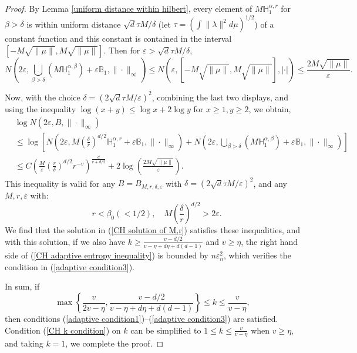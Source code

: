 \documentclass[ejs,noshowframe]{imsart}
\theoremstyle{plain}
\theoremstyle{definition}
\theoremstyle{remark}
\begin{document}
\begin{appendix}
\begin{proof}
By Lemma \ref{uniform distance within hilbert}, every element of $M \mathbb{H}_1^{\alpha,r}$ for $\beta>\delta$ is within uniform distance $ \sqrt{d} \tau M/\delta$ (let $\tau=(\int \|\lambda\|^2 d \mu)^{1/2}$) of a constant function and this constant is contained in the interval $[-M \sqrt{\|\mu\|}, M \sqrt{\|\mu\|}]$. Then for $\varepsilon> \sqrt{d} \tau M/\delta$,
$$
N\left(2 \varepsilon, \bigcup_{\beta>\delta}\left(M \mathbb{H}_1^{\alpha,\beta}\right)+\varepsilon \mathbb{B}_1,\|\cdot\|_{\infty}\right) \leq N(\varepsilon,[-M \sqrt{\|\mu\|}, M \sqrt{\|\mu\|}],|\cdot|) \leq \frac{2 M \sqrt{\|\mu\|}}{\varepsilon} .
$$

Now, with the choice $\delta=(2 \sqrt{d} \tau M/\varepsilon)^2$, combining the last two displays, and using the inequality $\log (x+y) \leq \log x+2 \log y$ for $x \geq 1, y \geq 2$, we obtain,
\begin{equation}\label{CH adaptive entropy inequality}
\begin{aligned}
&\log N\left(2 \varepsilon, B,\|\cdot\|_{\infty}\right) \\
&\leq  \log \left[N\left(2 \varepsilon, M (\frac{\delta}{r})^{d/2} \mathbb{H}_1^{\alpha,r}+\varepsilon \mathbb{B}_1,\|\cdot\|_{\infty}\right) +  N\left(2 \varepsilon, \bigcup_{\beta>\delta}\left(M \mathbb{H}_1^{\alpha,\beta}\right)+\varepsilon \mathbb{B}_1,\|\cdot\|_{\infty}\right)\right] \\
& \leq C \left( \frac{M}{\varepsilon} (\frac{r}{\delta})^{d/2}r^{-v}  \right)^{\frac{d}{v+d/2}} 
+ 2\log(\frac{2 M \sqrt{\|\mu\|}}{\varepsilon}) .
\end{aligned}
\end{equation}
This inequality is valid for any $B=B_{M, r, \delta, \varepsilon}$ with $\delta=(2 \sqrt{d} \tau M/\varepsilon)^2$, and any $M, r, \varepsilon$ with:
\begin{equation}
 \quad r < \beta_0 (<1/2), \quad M (\frac{\delta}{r})^{d/2}>2 \varepsilon.
\end{equation}
We find that the solution  in (\ref{CH solution of M,r}) satisfies these inequalities, and with this solution, if we also have $k\ge \frac{v-d/2}{v-\eta+d\eta+d(d-1)}$ and $v \ge \eta$, the right hand side of (\ref{CH adaptive entropy inequality}) is bounded by $n \varepsilon_n^2$, which verifies the condition in (\ref{adaptive condition3}).

In sum, if 
\begin{equation}\label{CH k condition}
\max\left\{\frac{v}{2v-\eta},\frac{v-d/2}{v-\eta+d\eta+d(d-1)}\right\}\leq k \leq \frac{v}{v-\eta},
\end{equation}
then conditions (\ref{adaptive condition1})--(\ref{adaptive condition3}) are satisfied. Condition (\ref{CH k condition}) on $k$  can be simplified to $1 \leq k \leq \frac{v}{v-\eta}$ when $v \ge \eta$, and taking $k=1$, we complete the proof.
\end{proof}


\end{appendix}
\end{document}
